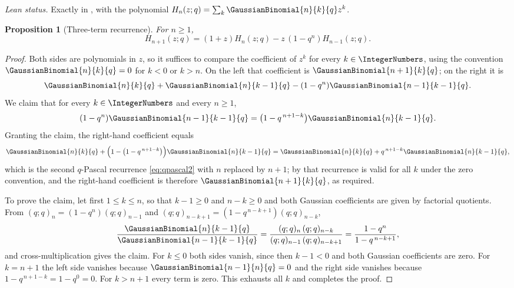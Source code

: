 \documentclass[11pt,a4paper,oneside,openany]{book}
\newtheorem{proposition}[proposition]{Proposition}
\theoremstyle{definition}
\theoremstyle{remark}
\begin{document}
\emph{Lean status.}  Exactly  in
, with  the polynomial
$H_n(z;q)=\sum_k\GaussianBinomial{n}{k}{q}z^k$.


\begin{proposition}[Three-term recurrence]\label{prop:rogers-szego-three-term}
For $n\ge1$,
\[
 H_{n+1}(z;q)=(1+z)H_n(z;q)-z\,(1-q^n)H_{n-1}(z;q).
\]
\end{proposition}

\begin{proof}
Both sides are polynomials in $z$, so it suffices to compare the coefficient
of $z^k$ for every $k\in\IntegerNumbers$, using the convention $\GaussianBinomial{n}{k}{q}=0$ for $k<0$ or
$k>n$.  On the left that coefficient is $\GaussianBinomial{n+1}{k}{q}$; on the right it is
\[
 \GaussianBinomial{n}{k}{q}+\GaussianBinomial{n}{k-1}{q}-(1-q^n)\GaussianBinomial{n-1}{k-1}{q}.
\]
We claim that for every $k\in\IntegerNumbers$ and every $n\ge1$,
\[
 (1-q^n)\GaussianBinomial{n-1}{k-1}{q}=\bigl(1-q^{\,n+1-k}\bigr)\GaussianBinomial{n}{k-1}{q}.
\]
Granting the claim, the right-hand coefficient equals
\[
 \GaussianBinomial{n}{k}{q}+\Bigl(1-\bigl(1-q^{\,n+1-k}\bigr)\Bigr)\GaussianBinomial{n}{k-1}{q}
 =\GaussianBinomial{n}{k}{q}+q^{\,n+1-k}\GaussianBinomial{n}{k-1}{q},
\]
which is the second $q$-Pascal recurrence \eqref{eq:qpascal2} with $n$
replaced by $n+1$; by  that recurrence is valid for all $k$
under the zero convention, and the right-hand coefficient is therefore
$\GaussianBinomial{n+1}{k}{q}$, as required.

To prove the claim, let first $1\le k\le n$, so that $k-1\ge0$ and
$n-k\ge0$ and both Gaussian coefficients are given by factorial quotients.
From $(q;q)_n=(1-q^n)(q;q)_{n-1}$ and
$(q;q)_{n-k+1}=(1-q^{\,n-k+1})(q;q)_{n-k}$,
\[
 \frac{\GaussianBinomial{n}{k-1}{q}}{\GaussianBinomial{n-1}{k-1}{q}}
 =\frac{(q;q)_n\,(q;q)_{n-k}}{(q;q)_{n-1}\,(q;q)_{n-k+1}}
 =\frac{1-q^n}{1-q^{\,n-k+1}},
\]
and cross-multiplication gives the claim.  For $k\le0$ both sides vanish,
since then $k-1<0$ and both Gaussian coefficients are zero.  For $k=n+1$ the
left side vanishes because $\GaussianBinomial{n-1}{n}{q}=0$ and the right side vanishes
because $1-q^{\,n+1-k}=1-q^0=0$.  For $k>n+1$ every term is zero.  This
exhausts all $k$ and completes the proof.
\end{proof}
\end{document}
